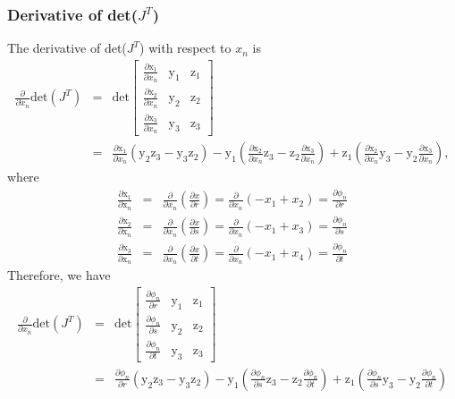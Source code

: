 \subsubsection{Derivative of det($J^T$) }

The derivative of det($J^T$) with respect to $x_n$ is
%
\begin{eqnarray}
\frac{\partial}{\partial x_n} \text{det}(J^T) &=& \text{det}
%
\begin{bmatrix}
\frac{\partial \text{x}_1}{\partial x_n} & \text{y}_1 & \text{z}_1 \\
\frac{\partial \text{x}_2}{\partial x_n} & \text{y}_2 & \text{z}_2 \\
\frac{\partial \text{x}_3}{\partial x_n} & \text{y}_3 & \text{z}_3
\end{bmatrix} \nonumber\\
%
&=& \frac{\partial \text{x}_1}{\partial x_n} \left(\text{y}_2 \text{z}_3 - \text{y}_3 \text{z}_2\right) - \text{y}_1 \left( \frac{\partial \text{x}_2}{\partial x_n} \text{z}_3 - \text{z}_2 \frac{\partial \text{x}_3}{\partial x_n} \right) + \text{z}_1 \left( \frac{\partial \text{x}_2}{\partial x_n} \text{y}_3 - \text{y}_2 \frac{\partial \text{x}_3}{\partial x_n} \right),
\end{eqnarray}
%
where
%
\begin{eqnarray}
\frac{\partial \text{x}_1}{\partial \text{x}_n} &=& \frac{\partial}{\partial x_n} \left( \frac{\partial x}{\partial r} \right) = \frac{\partial}{\partial x_n}\left(-x_1 + x_2 \right) = \frac{\partial \phi_n}{\partial r} \nonumber\\
%
\frac{\partial \text{x}_2}{\partial \text{x}_n} &=& \frac{\partial}{\partial x_n} \left( \frac{\partial x}{\partial s} \right) = \frac{\partial}{\partial x_n}\left(-x_1 + x_3  \right) = \frac{\partial \phi_n}{\partial s} \nonumber\\
%
\frac{\partial \text{x}_3}{\partial \text{x}_n} &=& \frac{\partial}{\partial x_n} \left( \frac{\partial x}{\partial t} \right) =  \frac{\partial}{\partial x_n}\left(-x_1+ x_4  \right) = \frac{\partial \phi_n}{\partial t}
%
\label{dxdxn_to_dphidr}
\end{eqnarray}
%
Therefore, we have
%
\begin{eqnarray}
%
\frac{\partial}{\partial x_n} \text{det}(J^T) &=&\text{det}
\begin{bmatrix}
\frac{\partial \phi_n}{\partial r} & \text{y}_1 & \text{z}_1 \\
\frac{\partial \phi_n}{\partial s} & \text{y}_2 & \text{z}_2 \\
\frac{\partial \phi_n}{\partial t} & \text{y}_3 & \text{z}_3
\end{bmatrix} \nonumber\\
%
&=& \frac{\partial \phi_n}{\partial r} \left(\text{y}_2 \text{z}_3 - \text{y}_3 \text{z}_2\right) - \text{y}_1 \left( \frac{\partial \phi_n}{\partial s} \text{z}_3 - \text{z}_2 \frac{\partial \phi_n}{\partial t} \right) + \text{z}_1 \left( \frac{\partial \phi_n}{\partial s} \text{y}_3 - \text{y}_2 \frac{\partial \phi_n}{\partial t} \right) 
\label{dJTx}
\end{eqnarray}
